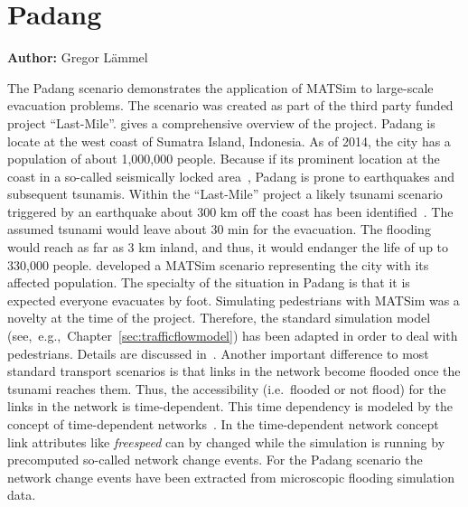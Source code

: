 \section{Padang}
\label{sec:padang}
\hfill \textbf{Author:} Gregor Lämmel

The Padang scenario demonstrates the application of MATSim to large-scale evacuation problems. The scenario was created as part of the third party funded project ``Last-Mile''. \citet{TaubenboeckEtAl2012ConcludingLastMilePaperNatHazards} gives a comprehensive overview of the project.
Padang is locate at the west coast of Sumatra Island, Indonesia. 
As of 2014, the city has a population of about 1,000,000 people. 
Because if its prominent location at the coast in a so-called seismically locked area~\citep{McCloskey2010Padang2009Earthquake}, Padang is prone to earthquakes and subsequent tsunamis. 
Within the ``Last-Mile'' project a likely tsunami scenario triggered by an earthquake about 300 km off the coast has been identified~\citep{GosebergSchlurmann2009HazardMappingPadang}. 
The assumed tsunami would leave about 30 min for the evacuation. 
The flooding would reach as far as 3 km inland, and thus, it would endanger the life of up to 330,000 people. \citet{Laemmel_PhDThesis_2011} developed a MATSim scenario representing the city with its affected population. 
The specialty of the situation in Padang is that it is expected everyone evacuates by foot. 
Simulating pedestrians with MATSim was a novelty at the time of the project. 
Therefore, the standard simulation model (see,~e.g.,~Chapter~\ref{sec:trafficflowmodel}) has been adapted in order to deal with pedestrians. 
Details are discussed in~\citep{LaemmelKluepfelNagel2009EvacPadangAtBookTimmermanns}. 
Another important difference to most standard transport scenarios is that links in the network become flooded once the tsunami reaches them. Thus, the accessibility (i.e.~flooded or not flood) for the links in the network is time-dependent. This time dependency is modeled by the concept of time-dependent networks~\citep{LaemmelEtAl_TransResC_2010}. In the time-dependent network concept link attributes  like \emph{freespeed} can by changed while the simulation is running by precomputed so-called network change events. For the Padang scenario the network change events have been extracted from microscopic flooding simulation data.

